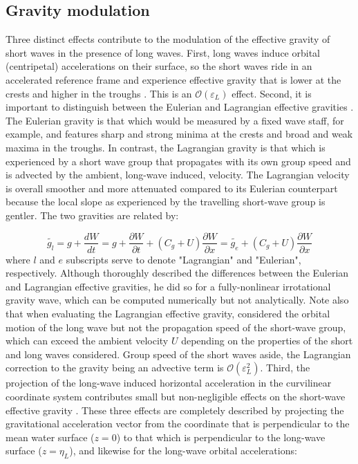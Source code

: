 \documentclass[lineno]{jfm}
\begin{document}
\subsection{Gravity modulation}
\label{subsection:gravity_modulation}

Three distinct effects contribute to the modulation of the effective gravity of
short waves in the presence of long waves.
First, long waves induce orbital (centripetal) accelerations on their surface,
so the short waves ride in an accelerated reference frame and experience effective
gravity that is lower at the crests and higher in the troughs
\citep{longuet1986eulerian,longuet1987propagation}.
This is an $\mathcal{O}(\varepsilon_L)$ effect.
Second, it is important to distinguish between the Eulerian and Lagrangian effective
gravities \citep{longuet1986eulerian}.
The Eulerian gravity is that which would be measured by a fixed wave staff,
for example, and features sharp and strong minima at the crests and broad
and weak maxima in the troughs.
In contrast, the Lagrangian gravity is that which is experienced by a short wave
group that propagates with its own group speed and is advected by the ambient,
long-wave induced, velocity.
The Lagrangian velocity is overall smoother and more attenuated compared to
its Eulerian counterpart because the local slope as experienced by the
travelling short-wave group is gentler.
The two gravities are related by:

\begin{equation}
\label{eq:gravity_modulation_lagrangian}
\widetilde{g_l} =
g + \frac{dW}{dt} =
g + \frac{\partial W}{\partial t} + \left(C_g + U\right) \frac{\partial W}{\partial x} =
\widetilde{g_e} + \left(C_g + U\right) \frac{\partial W}{\partial x}
\end{equation}
where $l$ and $e$ subscripts serve to denote "Lagrangian" and "Eulerian",
respectively.
Although \citet{longuet1986eulerian} thoroughly described the differences
between the Eulerian and Lagrangian effective gravities, he did so for
a fully-nonlinear irrotational gravity wave, which can be computed numerically
but not analytically.
Note also that when evaluating the Lagrangian effective gravity,
\citet{longuet1987propagation} considered the orbital motion of the long wave
but not the propagation speed of the short-wave group, which can exceed the
ambient velocity $U$ depending on the properties of the short and long waves
considered.
Group speed of the short waves aside, the Lagrangian correction to the gravity
being an advective term is $\mathcal{O}(\varepsilon_L^2)$.
Third, the projection of the long-wave induced horizontal acceleration in the
curvilinear coordinate system contributes small but non-negligible effects on
the short-wave effective gravity \citep{phillips1981dispersion,zhang1990evolution}.
These three effects are completely described by projecting the gravitational
acceleration vector from the coordinate that is perpendicular to the mean water
surface ($z=0$) to that which is perpendicular to the long-wave surface
($z=\eta_L$), and likewise for the long-wave orbital accelerations:
\end{document}
